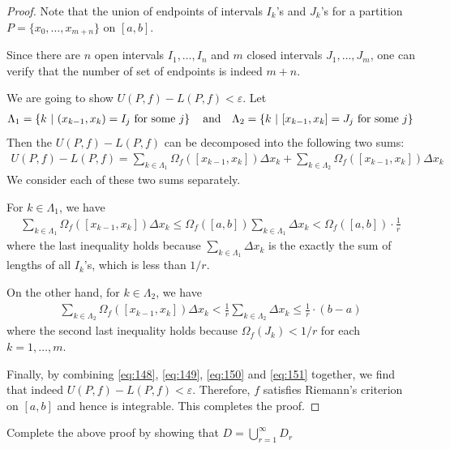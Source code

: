 \documentclass[thmcnt=section, 12pt]{my-elegantbook}
\begin{document}
\begin{proof}
	Note that the union of endpoints of intervals $I_k$'s and $J_k$'s
	for a partition $P=\{x_0, \ldots, x_{m+n}\}$ on $[a, b]$.
	\begin{note}
		Since there are $n$ open intervals $I_1, \ldots, I_n$
		and $m$ closed intervals $J_1, \ldots, J_m$,
		one can verify that the number of set of endpoints 
		is indeed $m+n$.
	\end{note}
	\noindent We are going to show $U(P,f) - L(P,f) < \varepsilon$.
	Let 
	\begin{align*}
		\Lambda_1 = \left\{ k \ \middle| \ (x_{k-1}, x_k) = I_j \text{ for some $j$} \right\}
		\quad \text{and} \quad
		\Lambda_2 = \left\{ k \ \middle| \ [x_{k-1}, x_k] = J_j \text{ for some $j$} \right\}
	\end{align*}
	Then the $U(P,f) - L(P,f)$ can be decomposed into 
	the following two sums:
	\begin{align}
		U(P,f) - L(P,f)
		= \sum_{k \in \Lambda_1} \Omega_f([x_{k-1}, x_k]) \Delta x_k
			+ \sum_{k \in \Lambda_2} \Omega_f([x_{k-1}, x_k]) \Delta x_k
		\label{eq:149}
	\end{align}
	We consider each of these two sums separately.

	For $k \in \Lambda_1$, we have
	\begin{align}
		\sum_{k \in \Lambda_1} \Omega_f([x_{k-1}, x_k]) \Delta x_k
		\leq \Omega_f([a, b]) \sum_{k \in \Lambda_1} \Delta x_k
		< \Omega_f([a, b]) \cdot \frac{1}{r} 
		\label{eq:150}
	\end{align}
	where the last inequality holds 
	because $\sum_{k \in \Lambda_1} \Delta x_k$ is the exactly
	the sum of lengths of all $I_k$'s, which is less than $1 / r$.

	On the other hand, for $k \in \Lambda_2$,
	we have 
	\begin{align}
		\sum_{k \in \Lambda_2} \Omega_f([x_{k-1}, x_k]) \Delta x_k
		< \frac{1}{r} \sum_{k \in \Lambda_2} \Delta x_k
		\leq \frac{1}{r} \cdot (b - a)
		\label{eq:151}
	\end{align}
	where the second last inequality holds
	because $\Omega_f(J_k) < 1 / r$ for each $k=1, \ldots, m$.
	
	Finally, by combining \eqref{eq:148}, \eqref{eq:149}, \eqref{eq:150}
	and \eqref{eq:151} together,
	we find that indeed $U(P,f) - L(P,f) < \varepsilon$.
	Therefore, $f$ satisfies Riemann's criterion on $[a, b]$
	and hence is integrable.
	This completes the proof.
\end{proof}

\begin{exercise} \label{ex:11}
	Complete the above proof by
	showing that $D = \bigcup_{r=1}^\infty D_r$
\end{exercise}
\end{document}
